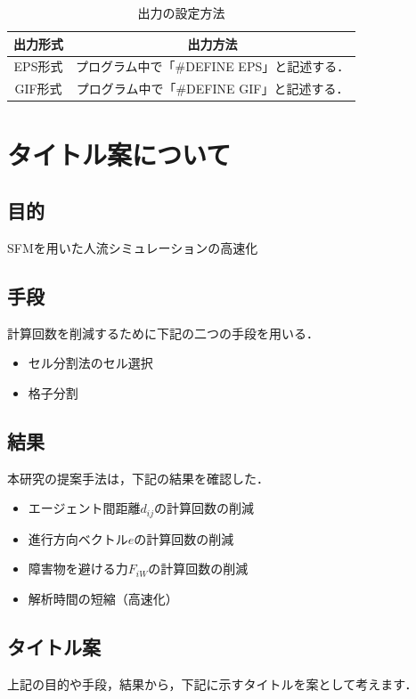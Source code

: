 \begin{table}[t]
  \begin{center}
    \caption{出力の設定方法}
    \label{tb:toggle_outputs}
    \begin{tabular}{c|c}
      \hline \hline
      出力形式 & 出力方法 \\ \hline
      EPS形式  & プログラム中で「\#DEFINE EPS」と記述する．\\ \hline
      GIF形式  & プログラム中で「\#DEFINE GIF」と記述する．\\ \hline
    \end{tabular}
  \end{center}
\end{table}

\chapter{タイトル案について}
\clearpage
\section{目的}
SFMを用いた人流シミュレーションの高速化

\section{手段}
計算回数を削減するために下記の二つの手段を用いる．
 
\begin{itemize}
\item セル分割法のセル選択
\item 格子分割
\end{itemize}

\section{結果}
本研究の提案手法は，下記の結果を確認した．

\begin{itemize}
\item エージェント間距離$d_{ij}$の計算回数の削減
\item 進行方向ベクトル$e$の計算回数の削減
\item 障害物を避ける力$F_{iW}$の計算回数の削減
\item 解析時間の短縮（高速化）
\end{itemize}

\section{タイトル案}
上記の目的や手段，結果から，下記に示すタイトルを案として考えます．

